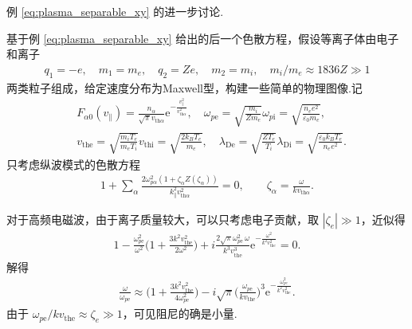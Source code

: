 \begin{exbox}
	例 \cref{eq:plasma_separable_xy} 的进一步讨论.

	基于例 \cref{eq:plasma_separable_xy} 给出的后一个色散方程，假设等离子体由电子和离子
	\begin{align*}
		q_1=-e,\quad m_1=m_e,\quad q_2=Ze,\quad m_2=m_i,\quad m_i/m_e\approx1836Z\gg1
	\end{align*}
	两类粒子组成，给定速度分布为Maxwell型，构建一些简单的物理图像.记
	\begin{align*}
		&F_{\alpha0}(v_{\parallel}) = \frac{n_\alpha}{\sqrt{\pi}v_{\mathrm{th}\alpha}}\mathrm{e}^{-\frac{v_{\parallel}^2}{v_{\mathrm{th}\alpha}^2}},\quad \omega_{p\mathrm{e}} = \sqrt{\frac{m_i}{Zm_e}}\omega_{p\mathrm{i}} = \sqrt{\frac{n_e e^2}{\varepsilon_0 m_e}},\\
		&v_{\mathrm{the}} = \sqrt{\frac{m_i T_e}{m_e T_i}}v_{\mathrm{thi}} = \sqrt{\frac{2k_B T_e}{m_e}},\quad \lambda_{\mathrm{De}} = \sqrt{\frac{ZT_e}{T_i}}\lambda_{\mathrm{Di}} = \sqrt{\frac{\varepsilon_0 k_B T_e}{n_e e^2}}.
	\end{align*}
	只考虑纵波模式的色散方程
	\begin{align*}
		1 + \sum_\alpha\frac{2\omega_{p\alpha}^2\left(1+\zeta_\alpha Z(\zeta_\alpha)\right)}{k_{\parallel}^2v_{\mathrm{th}\alpha}^2}=0,\qquad \zeta_\alpha = \frac{\omega}{k v_{\mathrm{th}\alpha}}.
	\end{align*}

	对于高频电磁波，由于离子质量较大，可以只考虑电子贡献，取 \(|\zeta_e|\gg1\)，近似得
	\begin{align*}
		1 - \frac{\omega_{p\mathrm{e}}^2}{\omega^2}\bigg(1+\frac{3k^2v_{\mathrm{the}}^2}{2\omega^2}\bigg) + i\frac{2\sqrt{\pi}\omega_{p\mathrm{e}}^2\,\omega}{k^3v_{\mathrm{the}}^3}\mathrm{e}^{-\frac{\omega^2}{k^2v_{\mathrm{the}}^2}} = 0.
	\end{align*}
	解得
	\begin{align*}
		\frac{\omega}{\omega_{p\mathrm{e}}}\approx\bigg(1+\frac{3k^2v_{\mathrm{the}}^2}{4\omega_{p\mathrm{e}}^2}\bigg) - i\sqrt{\pi}\bigg(\frac{\omega_{p\mathrm{e}}}{k v_{\mathrm{the}}}\bigg)^3\mathrm{e}^{-\frac{\omega_{p\mathrm{e}}^2}{k^2v_{\mathrm{the}}^2}}.
	\end{align*}
	由于 \(\omega_{p\mathrm{e}}/k v_{\mathrm{the}}\approx\zeta_e\gg1\)，可见阻尼的确是小量.


\end{exbox}
